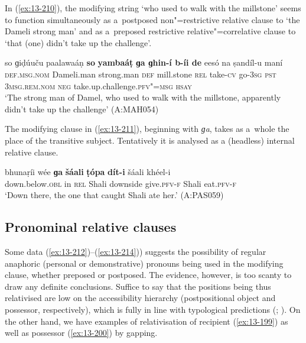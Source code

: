 In (\ref{ex:13-210}), the modifying string `who used to walk with the millstone' seems to function simultaneously as a~postposed non"=restrictive relative clause to `the Dameli strong man' and as a~preposed restrictive relative"=correlative clause to `that (one) didn't take up the challenge'.

\begin{exe}
\ex
\label{ex:13-210}
\gll so ɡiḍúuču paalawaáṇ \textbf{so} \textbf{yambaáṭ} \textbf{ ɡa ɡhin-í b-íi de} eesó na  ṣandíl-u maní \\
\textsc{def.msg.nom} Dameli.man strong.man \textsc{def} mill.stone \textsc{rel} take-\textsc{cv} go-\textsc{3sg} \textsc{pst} \textsc{3msg.rem.nom} \textsc{neg} take.up.challenge.\textsc{pfv"=msg} \textsc{hsay} \\
\glt `The strong man of Damel, who used to walk with the millstone, apparently didn't take up the
challenge' (A:MAH054)
\end{exe}

The modifying clause in (\ref{ex:13-211}), beginning with \textit{ɡa}, takes as a~whole the place of the transitive subject. Tentatively it is analysed as a (headless) internal relative clause.

\begin{exe}
\ex
\label{ex:13-211}
\gll bhunaṛíi wée \textbf{ɡa} \textbf{šáali} \textbf{ṭópa} \textbf{dít-i}  šáali khéel-i \\
down.below.\textsc{obl} in \textsc{rel} Shali downside give.\textsc{pfv-f} Shali eat.\textsc{pfv-f} \\
\glt `Down there, the one that caught Shali ate her.' (A:PAS059)
\end{exe}

\subsection{Pronominal relative clauses}
\label{subsec:13-6-5}


Some data (\ref{ex:13-212})--(\ref{ex:13-214})) suggests the possibility of regular anaphoric (personal or demonstrative) pronouns being used in the modifying clause, whether preposed or postposed. The evidence, however, is too scanty to draw any definite conclusions. Suffice to say that the positions being thus relativised are low on the accessibility hierarchy (postpositional object and possessor, respectively), which is fully in line with typological predictions (\citealt[147--148]{keenan1985}; \citealt[226]{andrews_relative2007}). On the other hand, we have examples of relativisation of recipient (\ref{ex:13-199}) as well as possessor (\ref{ex:13-200}) by gapping.

